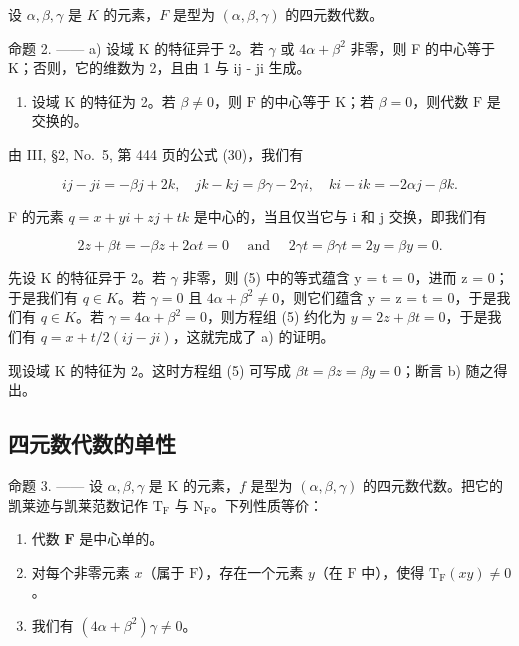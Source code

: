 设 \(\alpha, \beta, \gamma\) 是 \(K\) 的元素，\(F\) 是型为 \((\alpha, \beta, \gamma)\) 的四元数代数。

命题 2. —— a) 设域 K 的特征异于 2。若 \(\gamma\) 或 \(4\alpha + \beta^{2}\) 非零，则 F 的中心等于 K；否则，它的维数为 2，且由 1 与 ij - ji 生成。

\begin{enumerate}
\def\labelenumi{\alph{enumi})}
\setcounter{enumi}{1}
\tightlist
\item
  设域 \(\mathrm{K}\) 的特征为 2。若 \(\beta \neq 0\)，则 \(\mathrm{F}\) 的中心等于 \(\mathrm{K}\)；若 \(\beta = 0\)，则代数 \(\mathrm{F}\) 是交换的。
\end{enumerate}

由 III, §2, No.~5, 第 444 页的公式 (30)，我们有

\[
i j - j i = - \beta j + 2 k, \quad j k - k j = \beta \gamma - 2 \gamma i, \quad k i - i k = - 2 \alpha j - \beta k. \tag {4}
\]

F 的元素 \(q = x + yi + zj + tk\) 是中心的，当且仅当它与 i 和 j 交换，即我们有

\[
2 z + \beta t = - \beta z + 2 \alpha t = 0 \quad \text { and } \quad 2 \gamma t = \beta \gamma t = 2 y = \beta y = 0.\tag{5}
\]

先设 K 的特征异于 2。若 \(\gamma\) 非零，则 (5) 中的等式蕴含 y = t = 0，进而 z = 0；于是我们有 \(q \in K\)。若 \(\gamma = 0\) 且 \(4\alpha + \beta^{2} \neq 0\)，则它们蕴含 y = z = t = 0，于是我们有 \(q \in K\)。若 \(\gamma = 4\alpha + \beta^{2} = 0\)，则方程组 (5) 约化为 \(y = 2z + \beta t = 0\)，于是我们有 \(q = x + t/2(ij - ji)\)，这就完成了 a) 的证明。

现设域 K 的特征为 2。这时方程组 (5) 可写成 \(\beta t = \beta z = \beta y = 0\)；断言 b) 随之得出。

\subsection{四元数代数的单性}

命题 3. —— 设 \(\alpha, \beta, \gamma\) 是 K 的元素，\(f\) 是型为 \((\alpha, \beta, \gamma)\) 的四元数代数。把它的凯莱迹与凯莱范数记作 \(\mathrm{T}_{\mathrm{F}}\) 与 \(\mathrm{N}_{\mathrm{F}}\)。下列性质等价：

\begin{enumerate}
\def\labelenumi{(\roman{enumi})}
\item
  代数 \(\mathbf{F}\) 是中心单的。
\item
  对每个非零元素 \(x\)（属于 \(\mathrm{F}\)），存在一个元素 \(y\)（在 \(\mathrm{F}\) 中），使得 \(\mathrm{T}_{\mathrm{F}}(xy) \neq 0\)。
\item
  我们有 \((4\alpha + \beta^{2})\gamma \neq 0\)。
\end{enumerate}


